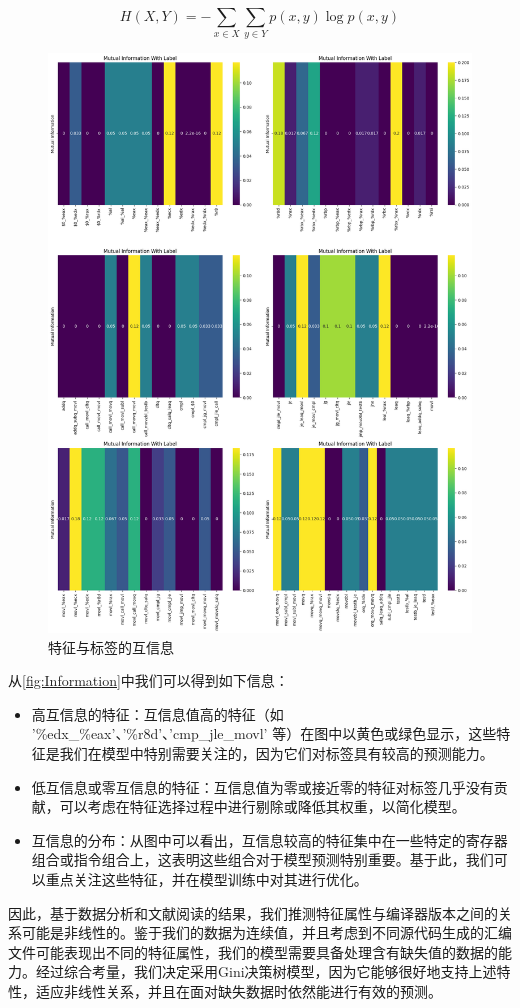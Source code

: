 \begin{equation}
H(X, Y) = -\sum_{x \in X} \sum_{y \in Y} p(x, y) \log p(x, y)
\label{eq:joint_entropy}
\end{equation}
\begin{figure}[H]
      \centering
      \includegraphics[width=0.75\linewidth]{figures/Information.png}
      \caption{特征与标签的互信息}
      \label{fig:Information}
  \end{figure}
从\autoref{fig:Information}中我们可以得到如下信息：
\begin{itemize}
    \item 高互信息的特征：互信息值高的特征（如 '\%edx\_\%eax'、'\%r8d'、'cmp\_jle\_movl' 等）在图中以黄色或绿色显示，这些特征是我们在模型中特别需要关注的，因为它们对标签具有较高的预测能力。
    \item 低互信息或零互信息的特征：互信息值为零或接近零的特征对标签几乎没有贡献，可以考虑在特征选择过程中进行剔除或降低其权重，以简化模型。
    \item 互信息的分布：从图中可以看出，互信息较高的特征集中在一些特定的寄存器组合或指令组合上，这表明这些组合对于模型预测特别重要。基于此，我们可以重点关注这些特征，并在模型训练中对其进行优化。
\end{itemize}

因此，基于数据分析和文献阅读的结果，我们推测特征属性与编译器版本之间的关系可能是非线性的。鉴于我们的数据为连续值，并且考虑到不同源代码生成的汇编文件可能表现出不同的特征属性，我们的模型需要具备处理含有缺失值的数据的能力。经过综合考量，我们决定采用Gini决策树模型，因为它能够很好地支持上述特性，适应非线性关系，并且在面对缺失数据时依然能进行有效的预测。
